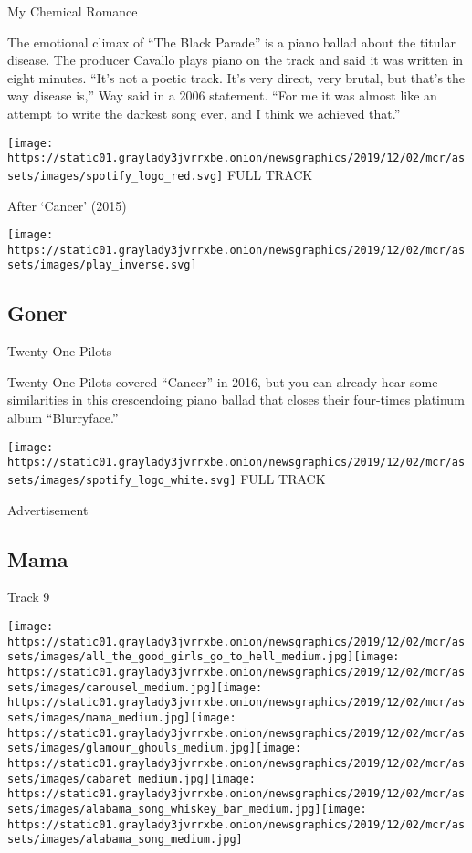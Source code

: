My Chemical Romance

The emotional climax of ``The Black Parade'' is a piano ballad about the
titular disease. The producer Cavallo plays piano on the track and said
it was written in eight minutes. ``It's not a poetic track. It's very
direct, very brutal, but that's the way disease is,'' Way said in a 2006
statement. ``For me it was almost like an attempt to write the darkest
song ever, and I think we achieved that.''

\href{https://open.spotify.com/track/0GgN4MhR5GKn5IcKN0e0rG?si=t8i0XJh2S5qCA1JMeUwa9w}{}

\texttt{[image: https://static01.graylady3jvrrxbe.onion/newsgraphics/2019/12/02/mcr/assets/images/spotify\_logo\_red.svg]}
FULL TRACK

After `Cancer' (2015)

\texttt{[image: https://static01.graylady3jvrrxbe.onion/newsgraphics/2019/12/02/mcr/assets/images/play\_inverse.svg]}

\hypertarget{goner}{%
\subsection{Goner}\label{goner}}

Twenty One Pilots

Twenty One Pilots covered ``Cancer'' in 2016, but you can already hear
some similarities in this crescendoing piano ballad that closes their
four-times platinum album ``Blurryface.''

\href{https://open.spotify.com/track/5P3yUXUC9rZPJPNmYGKEAz?si=qq0w2xG5S1mDhzWAnazZfw}{}

\texttt{[image: https://static01.graylady3jvrrxbe.onion/newsgraphics/2019/12/02/mcr/assets/images/spotify\_logo\_white.svg]}
FULL TRACK

Advertisement

\hypertarget{mama}{%
\subsection{Mama}\label{mama}}

Track 9

\texttt{[image: https://static01.graylady3jvrrxbe.onion/newsgraphics/2019/12/02/mcr/assets/images/all\_the\_good\_girls\_go\_to\_hell\_medium.jpg]}\texttt{[image: https://static01.graylady3jvrrxbe.onion/newsgraphics/2019/12/02/mcr/assets/images/carousel\_medium.jpg]}\texttt{[image: https://static01.graylady3jvrrxbe.onion/newsgraphics/2019/12/02/mcr/assets/images/mama\_medium.jpg]}\texttt{[image: https://static01.graylady3jvrrxbe.onion/newsgraphics/2019/12/02/mcr/assets/images/glamour\_ghouls\_medium.jpg]}\texttt{[image: https://static01.graylady3jvrrxbe.onion/newsgraphics/2019/12/02/mcr/assets/images/cabaret\_medium.jpg]}\texttt{[image: https://static01.graylady3jvrrxbe.onion/newsgraphics/2019/12/02/mcr/assets/images/alabama\_song\_whiskey\_bar\_medium.jpg]}\texttt{[image: https://static01.graylady3jvrrxbe.onion/newsgraphics/2019/12/02/mcr/assets/images/alabama\_song\_medium.jpg]}

